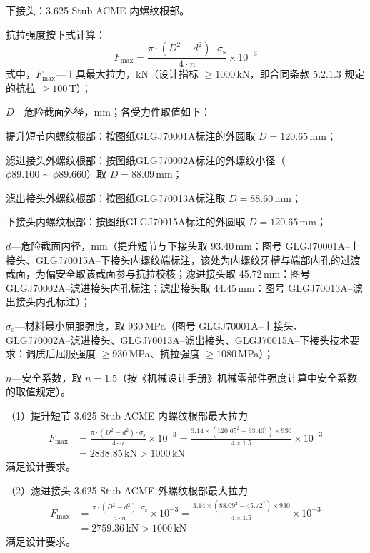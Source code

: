 下接头：3.625 Stub ACME 内螺纹根部。

抗拉强度按下式计算：
\begin{equation}
F_{\max} = \frac{\pi \cdot (D^2 - d^2) \cdot \sigma_{\mathrm{s}}}{4 \cdot n} \times 10^{-3}
\end{equation}
式中，$F_{\max}$---工具最大拉力，kN（设计指标 $\ge 1000$\,kN，即合同条款 5.2.1.3 规定的抗拉 $\ge 100$\,T）；

$D$---危险截面外径，mm；各受力件取值如下：

\quad 提升短节内螺纹根部：按图纸GLGJ70001A标注的外圆取 $D = 120.65\,\text{mm}$；

\quad 滤进接头外螺纹根部：按图纸GLGJ70002A标注的外螺纹小径（$\phi 89.100\sim \phi 89.660 $）取 $D = 88.09\,\text{mm}$；

\quad 滤出接头外螺纹根部：按图纸GLGJ70013A标注取 $D = 88.60\,\text{mm}$；

\quad 下接头内螺纹根部：按图纸GLGJ70015A标注的外圆取 $D = 120.65\,\text{mm}$；

$d$---危险截面内径，mm（提升短节与下接头取 93.40\,mm：图号 GLGJ70001A--上接头、GLGJ70015A--下接头内螺纹端标注，该处为内螺纹牙槽与端部内孔的过渡截面，为偏安全取该截面参与抗拉校核；滤进接头取 45.72\,mm：图号 GLGJ70002A--滤进接头内孔标注；滤出接头取 44.45\,mm：图号 GLGJ70013A--滤出接头内孔标注）；

$\sigma_{\mathrm{s}}$---材料最小屈服强度，取 930\,MPa（图号 GLGJ70001A--上接头、GLGJ70002A--滤进接头、GLGJ70013A--滤出接头、GLGJ70015A--下接头技术要求：调质后屈服强度 $\ge 930$\,MPa、抗拉强度 $\ge 1080$\,MPa）；

$n$---安全系数，取 $n = 1.5$（按《机械设计手册》机械零部件强度计算中安全系数的取值规定\cite{ref26}）。

（1）提升短节 3.625 Stub ACME 内螺纹根部最大拉力
\begin{equation}
    \begin{aligned}
        F_{\max} &= \frac{\pi \cdot (D^2 - d^2) \cdot \sigma_\mathrm{s}}{4 \cdot n} \times 10^{-3} 
                = \frac{3.14 \times (120.65^2 - 93.40^2) \times 930}{4 \times 1.5} \times 10^{-3} \\
                &= 2838.85\,\text{kN} > 1000\,\text{kN}
    \end{aligned}
\end{equation}
满足设计要求。

（2）滤进接头 3.625 Stub ACME 外螺纹根部最大拉力
\begin{equation}
    \begin{aligned}
        F_{\max} &= \frac{\pi \cdot (D^2 - d^2) \cdot \sigma_\mathrm{s}}{4 \cdot n} \times 10^{-3} 
                = \frac{3.14 \times (88.09^2 - 45.72^2) \times 930}{4 \times 1.5} \times 10^{-3} \\
                &= 2759.36\,\text{kN} > 1000\,\text{kN}
    \end{aligned}
\end{equation}
满足设计要求。

